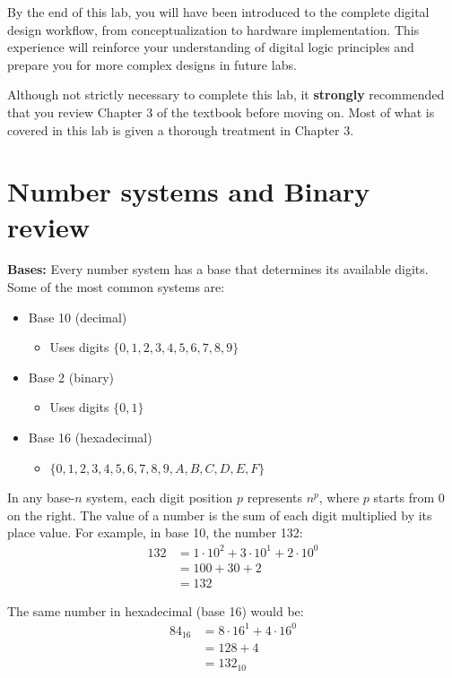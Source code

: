 \documentclass[12pt]{labmanual}
\begin{document}
By the end of this lab, you will have been introduced to the complete digital design workflow, from conceptualization to hardware implementation. This experience will reinforce your understanding of digital logic principles and prepare you for more complex designs in future labs.

\clearpage

\begin{extra}[frametitle={Textbook Reading}]
    Although not strictly necessary to complete this lab, it \textbf{strongly} recommended that you review Chapter 3 of the textbook before moving on. Most of what is covered in this lab is given a thorough treatment in Chapter 3.
\end{extra}
\section{Number systems and Binary review}
\noindent\textbf{Bases:}\hfill\break
Every number system has a base that determines its available digits. Some of the most common systems are:
\begin{itemize}
    \item Base 10 (decimal)
    \begin{itemize}
        \item Uses digits $\{0,1,2,3,4,5,6,7,8,9\}$
    \end{itemize}
    \item Base 2 (binary) 
    \begin{itemize}
        \item Uses digits $\{0,1\}$
    \end{itemize}
    \item Base 16 (hexadecimal)
    \begin{itemize}
        \item $\{0,1,2,3,4,5,6,7,8,9,A,B,C,D,E,F\}$
    \end{itemize}
\end{itemize}

In any base-$n$ system, each digit position $p$ represents $n^p$, where $p$ starts from 0 on the right. The value of a number is the sum of each digit multiplied by its place value.
For example, in base 10, the number 132:
\begin{align*}    
132 &= 1 \cdot 10^2 + 3 \cdot 10^1 + 2 \cdot 10^0
\\&= 100 + 30 + 2
\\&= 132
\end{align*}

The same number in hexadecimal (base 16) would be:
\begin{align*}    
84_{16} &= 8 \cdot 16^1 + 4 \cdot 16^0 \\
&= 128 + 4 \\
&= 132_{10}
\end{align*}
\end{document}
